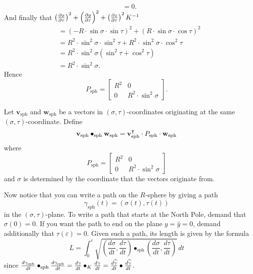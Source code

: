 \documentclass[newpage,hints,handout,noauthor,nooutcomes,12pt]{ximera}
\begin{document}
\begin{problem}
\begin{freeResponse}
\begin{align*}
      &= 0.
    \end{align*}
    And finally that $\left(\pp[x]{\tau}\right)^2 + \left(\pp[y]{\tau}\right)^2 + \left(\pp[z]{\tau}\right)^2K^{-1}$
     \begin{align*}
       &= \left(-R\cdot \sin\sigma\cdot \sin \tau \right)^2 + \left( R\cdot \sin\sigma\cdot \cos\tau \right)^2 \\
       &= R^2\cdot \sin^2\sigma\cdot \sin^2 \tau + R^2\cdot \sin^2\sigma\cdot \cos^2\tau \\
       &= R^2\cdot \sin^2\sigma\left(\sin^2 \tau + \cos^2\tau\right) \\
       &= R^2\cdot \sin^2\sigma.
     \end{align*}
     Hence
     \[
     P_\mathrm{sph} =
  \begin{bmatrix}
    R^2 & 0 \\
    0 & R^2\cdot\sin^2 \sigma
  \end{bmatrix}.
     \]
  \end{freeResponse}
\end{problem}

\begin{definition}
  Let $\mathbf{v}_\mathrm{sph}$ and $\mathbf{w}_\mathrm{sph}$ be a vectors in
  $(\sigma,\tau)$-coordinates originating at the same
  $(\sigma,\tau)$-coordinate. Define
  \[
  \mathbf{v}_\mathrm{sph} \bullet_\mathrm{sph} \mathbf{w}_\mathrm{sph} = \mathbf{v}_\mathrm{sph}^\transpose \cdot P_\mathrm{sph}\cdot \mathbf{w}_\mathrm{sph}
  \]
  where
  \[
  P_\mathrm{sph} =
  \begin{bmatrix}
    R^2 & 0 \\
    0 & R^2\cdot\sin^2 \sigma
  \end{bmatrix}
  \]
  and $\sigma$ is determined by the coordinate that the vectors
  originate from.
\end{definition}


Now notice that you can write a path on the $R$-sphere by giving a
path
\[
\gamma_\mathrm{sph}(t) = \left( \sigma(t),\tau(t)\right)
\]
in the $(\sigma,\tau)$-plane.  To write a path that starts at the
North Pole, demand that $\sigma(0)=0$.  If you want the path to end on
the plane $y=\hat{y}=0$, demand additionally that $\tau(\varepsilon)=0$. Given
such a path, its length is given by the formula%
 \[
   L=\int_{0}^\varepsilon \sqrt{\left(\frac{d\sigma}{dt},\frac{d\tau}{dt}\right)
     \bullet_\mathrm{sph} \left(\frac{d\sigma}{dt},\frac{d\tau}{dt}\right)}\, dt
 \]
 since $\frac{d\gamma_\mathrm{sph}}{d t} \dot_\mathrm{sph} \frac{d\gamma_\mathrm{sph}}{d t}
 = \frac{d\gamma}{d t} \dot_K \frac{d\gamma}{d t} = \frac{d\hat \gamma}{d t} \dot \frac{d\hat\gamma}{d t}$.
\end{document}
